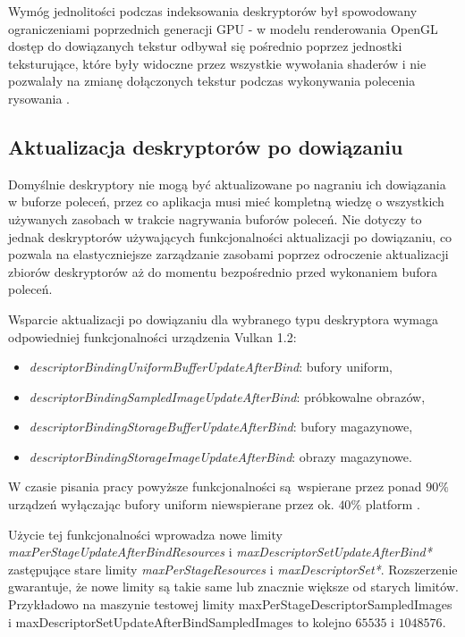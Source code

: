 Wymóg jednolitości podczas indeksowania deskryptorów był spowodowany ograniczeniami poprzednich generacji GPU - w modelu renderowania OpenGL dostęp do dowiązanych tekstur odbywał się pośrednio poprzez jednostki teksturujące, które były widoczne przez wszystkie wywołania shaderów i nie pozwalały na zmianę dołączonych tekstur podczas wykonywania polecenia rysowania \cite{GPUGEM4}. 

\subsection {Aktualizacja deskryptorów po dowiązaniu}

Domyślnie deskryptory nie mogą być aktualizowane po nagraniu ich dowiązania w buforze poleceń, przez co aplikacja musi mieć kompletną wiedzę o wszystkich używanych zasobach w trakcie nagrywania buforów poleceń.
Nie dotyczy to jednak deskryptorów używających funkcjonalności aktualizacji po dowiązaniu, co pozwala na elastyczniejsze zarządzanie zasobami poprzez odroczenie aktualizacji zbiorów deskryptorów aż do momentu bezpośrednio przed wykonaniem bufora poleceń.

Wsparcie aktualizacji po dowiązaniu dla wybranego typu deskryptora wymaga odpowiedniej funkcjonalności urządzenia Vulkan 1.2:
\begin{itemize}
	\item {\textit{descriptorBindingUniformBufferUpdateAfterBind}}: bufory uniform,
	\item {\textit{descriptorBindingSampledImageUpdateAfterBind}}: próbkowalne obrazów,
	\item {\textit{descriptorBindingStorageBufferUpdateAfterBind}}: bufory magazynowe,
	\item {\textit{descriptorBindingStorageImageUpdateAfterBind}}: obrazy magazynowe.
\end{itemize}
W czasie pisania pracy powyższe funkcjonalności są wspierane przez ponad $90\%$ urządzeń wyłączając bufory uniform niewspierane przez ok. $40\%$ platform \cite{GPUINFO}.

Użycie tej funkcjonalności wprowadza nowe limity \textit{maxPerStageUpdateAfterBindResources} i \textit{maxDescriptorSetUpdateAfterBind*}
zastępujące stare limity \textit{maxPerStageResources} i \textit{maxDescriptorSet*}. Rozszerzenie gwarantuje, że nowe limity są takie same lub znacznie większe od starych limitów. Przykładowo na maszynie testowej limity maxPerStageDescriptorSampledImages i maxDescriptorSetUpdateAfterBindSampledImages to kolejno $65535$ i $1048576$.

